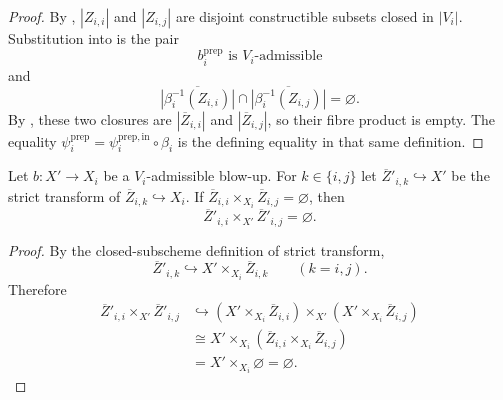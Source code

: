\begin{proof}
  By ,
  $|Z_{i,i}|$ and $|Z_{i,j}|$ are disjoint constructible subsets closed in
  $|V_i|$.  Substitution into
   is the pair
  \[
    b_i^{\mathrm{prep}}\text{ is }V_i\text{-admissible}
  \]
  and
  \[
    \overline{|\beta_i^{-1}(Z_{i,i})|}
      \cap
    \overline{|\beta_i^{-1}(Z_{i,j})|}
    =\varnothing.
  \]
  By , these two closures are
  $|\overline Z_{i,i}|$ and $|\overline Z_{i,j}|$, so their fibre product is
  empty.  The equality
  $\psi_i^{\mathrm{prep}}
    =\psi_i^{\mathrm{prep,in}}\circ\beta_i$ is the defining
  equality in that same definition.
\end{proof}

\begin{lemma}
  \label{lemma:nagata-boundary-disjoint-persists}
  \lean{}

  Let $b\colon X'\to X_i$ be a $V_i$-admissible blow-up.  For
  $k\in\{i,j\}$ let $\overline Z'_{i,k}\hookrightarrow X'$ be the strict
  transform of $\overline Z_{i,k}\hookrightarrow X_i$.  If
  $\overline Z_{i,i}\times_{X_i}\overline Z_{i,j}=\varnothing$, then
  \[
    \overline Z'_{i,i}\times_{X'}\overline Z'_{i,j}=\varnothing.
  \]
\end{lemma}

\begin{proof}
  By the closed-subscheme definition of strict transform,
  \[
    \overline Z'_{i,k}
      \hookrightarrow X'\times_{X_i}\overline Z_{i,k}
      \qquad(k=i,j).
  \]
  Therefore
  \[
  \begin{aligned}
    \overline Z'_{i,i}\times_{X'}\overline Z'_{i,j}
      &\hookrightarrow
        (X'\times_{X_i}\overline Z_{i,i})
          \times_{X'}
        (X'\times_{X_i}\overline Z_{i,j})\\
      &\cong
        X'\times_{X_i}
          (\overline Z_{i,i}\times_{X_i}\overline Z_{i,j})\\
      &=X'\times_{X_i}\varnothing
       =\varnothing.
  \end{aligned}
  \]
\end{proof}

